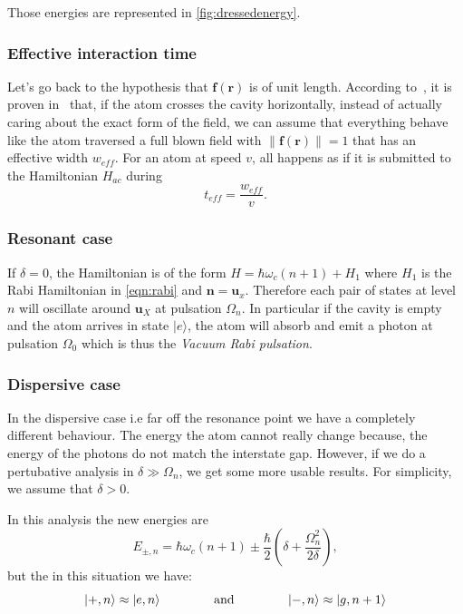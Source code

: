 \documentclass[10pt,a4paper]{report}
\theoremstyle{plain}
\theoremstyle{definition}
\theoremstyle{remark}
\newcommand{\ket}[1]{|#1\rangle}
\newcommand{\bs}{\boldsymbol}
\newcommand{\gap}{\hspace{1.5cm}}
\begin{document}
Those energies are represented in \cref{fig:dressedenergy}.



\subsubsection{Effective interaction time}
\newcommand{\eff}{_{e\!f\!\!f}}

Let's go back to the hypothesis that $\bs f(\bs r)$ is of unit length. According
to~\cite{SayPHD11}, it is proven in~\cite{Har06} that, if the atom crosses the
cavity horizontally, instead of actually caring about the exact form of the
field, we can assume that everything behave like the atom traversed a full blown
field with $\|\bs f(\bs r)\| = 1$ that has an effective width $w\eff$. For an
atom at speed $v$, all happens as if it is submitted to the Hamiltonian $H_{ac}$
during
\[t\eff = \frac{w\eff}v.\]

\subsubsection{Resonant case}

If $\delta = 0$, the Hamiltonian is of the form $H = \hbar \omega_c(n+1) + H_1$
where $H_1$ is the Rabi Hamiltonian in \cref{eqn:rabi} and $\bs n =
\bs u_x$. Therefore each pair of states at level $n$ will oscillate around $\bs
u_X$ at pulsation $\Omega_n$. In particular if the cavity is empty and the atom
arrives in state $\ket e$, the atom will absorb and emit a photon at pulsation
$\Omega_0$ which is thus the \emph{Vacuum Rabi pulsation}.

\subsubsection{Dispersive case}\label{sssec:disp}

In the dispersive case i.e far off the resonance point we have a completely
different behaviour. The energy the atom cannot really change because, the
energy of the photons do not match the interstate gap. However, if we do a
pertubative analysis in $\delta \gg \Omega_n$, we get some more usable results.
For simplicity, we assume that $\delta > 0$.

In this analysis the new energies are
\[E_{\pm,n} = \hbar \omega_c(n+1) \pm \frac{\hbar }2 \left(\delta + \frac{\Omega_n^2}{2\delta}\right),\]
but the in this situation we have:
\[ \ket{+,n} \approx \ket{e,n} \gap \text{and}\gap \ket{-,n} \approx \ket{g,n+1} \]
\end{document}
